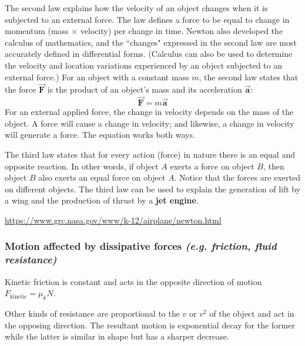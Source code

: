 \documentclass[11pt]{article}
\numberwithin{equation}{section}
\newcommand{\bvec}[1]{\boldsymbol{\vec{#1}}}
\begin{document}
				The second law explains how the velocity of an object changes when it is subjected to an external force. The law defines a force to be equal to change in momentum (mass $\times$ velocity) per change in time. Newton also developed the calculus of mathematics, and the ``changes" expressed in the second law are most accurately defined in differential forms. (Calculus can also be used to determine the velocity and location variations experienced by an object subjected to an external force.) For an object with a constant mass $m$, the second law states that the force $\bvec{F}$ is the product of an object's mass and its acceleration $\bvec{a}$:
				\begin{equation*}
					\bvec{F}=m\bvec{a}
				\end{equation*}
				For an external applied force, the change in velocity depends on the mass of the object. A force will cause a change in velocity; and likewise, a change in velocity will generate a force. The equation works both ways.
				
				The third law states that for every action (force) in nature there is an equal and opposite reaction. In other words, if object $A$ exerts a force on object $B$, then object $B$ also exerts an equal force on object $A$. Notice that the forces are exerted on different objects. The third law can be used to explain the generation of lift by a wing and the production of thrust by a \textbf{jet engine}.
				
				\url{https://www.grc.nasa.gov/www/k-12/airplane/newton.html}
			\subsubsection{Motion affected by dissipative forces {\small \normalfont \em (e.g. friction, fluid resistance)}}
				Kinetic friction is constant and acts in the opposite direction of motion $F_{\text{kinetic}} = \mu_k N$.
				
				Other kinds of resistance are proportional to the $v$ or $v^2$ of the object and act in the opposing direction. The resultant motion is exponential decay for the former while the latter is similar in shape but has a sharper decrease.
\end{document}
